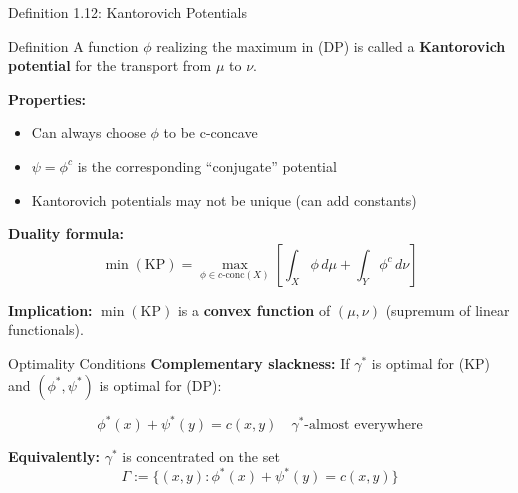 \documentclass[aspectratio=169]{beamer}
\begin{document}
\begin{frame}{Definition 1.12: Kantorovich Potentials}
\begin{block}{Definition}
A function $\phi$ realizing the maximum in (DP) is called a \textbf{Kantorovich potential} for the transport from $\mu$ to $\nu$.
\end{block}

\vspace{0.3cm}
\textbf{Properties:}
\begin{itemize}
    \item Can always choose $\phi$ to be c-concave
    \item $\psi = \phi^c$ is the corresponding ``conjugate'' potential
    \item Kantorovich potentials may not be unique (can add constants)
\end{itemize}

\vspace{0.4cm}
\textbf{Duality formula:}
\[
\boxed{\min(\text{KP}) = \max_{\phi \in c\text{-conc}(X)} \left[ \int_X \phi \, d\mu + \int_Y \phi^c \, d\nu \right]}
\]

\vspace{0.2cm}
\textbf{Implication:} $\min(\text{KP})$ is a \textbf{convex function} of $(\mu, \nu)$ (supremum of linear functionals).
\end{frame}

\begin{frame}{Optimality Conditions}
\textbf{Complementary slackness:} If $\gamma^*$ is optimal for (KP) and $(\phi^*, \psi^*)$ is optimal for (DP):

\vspace{0.3cm}
\[
\boxed{\phi^*(x) + \psi^*(y) = c(x,y) \quad \gamma^*\text{-almost everywhere}}
\]

\vspace{0.3cm}
\textbf{Equivalently:} $\gamma^*$ is concentrated on the set
\[
\Gamma := \{(x,y) : \phi^*(x) + \psi^*(y) = c(x,y)\}
\]

\vspace{0.4cm}
\begin{center}
\end{center}
\end{frame}
\end{document}
